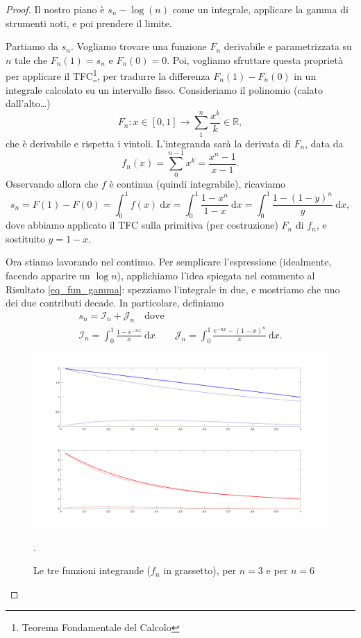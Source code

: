 \begin{proof}
	Il nostro piano è $s_n - \log(n)$ come un integrale, applicare la gamma di strumenti noti, e poi prendere il limite.

	Partiamo da $s_n$. 
	Vogliamo trovare una funzione $F_n$ derivabile e parametrizzata su $n$ tale che $F_n(1)=s_n$ e $F_n(0)=0$. 
	Poi, vogliamo sfruttare questa proprietà per applicare il TFC\footnote{Teorema Fondamentale del Calcolo}, per tradurre la differenza $F_n(1)-F_n(0)$ in un integrale calcolato su un intervallo fisso.
	Consideriamo il polinomio (calato dall'alto\dots)
	\begin{equation*}
		F_n : x \in [0,1] \to
		\sum^n_1 \frac{x^k}{k} \in \mathbb{R},
	\end{equation*}
	che è derivabile e rispetta i vintoli.
	L'integranda sarà la derivata di $F_n$, data da
	\begin{equation}
		\label{res1}
		f_n(x)= 
		\sum^{n-1}_0x^k= 
		\frac{x^n-1}{x-1}.
	\end{equation}	
	Osservando allora che $f$ è continua (quindi integrabile), ricaviamo
	\begin{equation*}
		s_n=
		F(1)-F(0)= 
		\int^1_0f(x) \: \mathrm{d}x= 
		\int^1_0 \frac{1-x^n}{1-x} \: \mathrm{d}x= 
		\int^1_0 \frac{1-(1-y)^n}{y} \: \mathrm{d}x,
	\end{equation*}	
	dove abbiamo applicato il TFC sulla primitiva (per costruzione) $F_n$ di $f_n$, e sostituito $y=1-x$. 
	
	Ora stiamo lavorando nel continuo. Per semplicare l'espressione (idealmente, facendo apparire un $\log n$), applichiamo l'idea spiegata nel commento al Risultato \ref{eq_fun_gamma}: spezziamo l'integrale in due, e mostriamo che uno dei due contributi decade.
	In particolare, definiamo
	\begin{gather*}
		s_n = 
		\mathcal{I}_n + \mathcal{J}_n \quad \text{dove} \\
		\mathcal{I}_n = \int^1_0 \frac{1-e^{-nx}}{x} \: \mathrm{d} x 
		\qquad 
		\mathcal{J}_n= \int^1_0 \frac{e^{-nx}-(1-x)^n}{x} \: \mathrm{d} x.
	\end{gather*}
	
	\begin{figure}
		\centering
		\includegraphics[width=.9\textwidth]{assets/eulero_mascheroni_choice.png}
		\caption{Le tre funzioni integrande ($f_n$ in grassetto), per $n=3$ e per $n=6$}.		
	\end{figure}


\end{proof}
